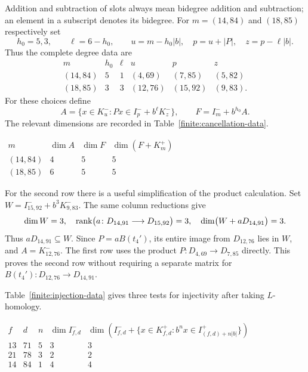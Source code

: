 Addition and subtraction of slots always mean bidegree
addition and subtraction; an element in a subscript denotes its
bidegree.  For $m=(14,84)$ and $(18,85)$ respectively set
\[
 h_0=5,3,\qquad \ell=6-h_0,\qquad
 u=m-h_0|b|,\quad p=u+|P|,\quad z=p-\ell|b|.
\]
Thus the complete degree data are
\[
\begin{array}{c|cc|ccc}
 m&h_0&\ell&u&p&z\\\hline
 (14,84)&5&1&(4,69)&(7,85)&(5,82)\\
 (18,85)&3&3&(12,76)&(15,92)&(9,83).
\end{array}
\]
For these choices define
\begin{equation}\label{finite:cancellation-spaces}
 A=\{x\in K^-_u:Px\in I^-_p+b^\ell K^-_z\},
 \qquad F=I^-_m+b^{h_0}A.
\end{equation}
The relevant dimensions are recorded in
Table~\ref{finite:cancellation-data}.

\begin{table}[htbp]
\centering
\(
\begin{array}{c|rrr}
 m&\dim A&\dim F&\dim(F+K^+_m)\\\hline
 (14,84)&4&5&5\\
 (18,85)&6&5&5
\end{array}
\)
\caption{Dimensions of the cancellation subspaces.}
\label{finite:cancellation-data}
\end{table}

For the second row there is a useful simplification of the product
calculation.  Set $W=I^-_{15,92}+b^3K^-_{9,83}$.  The same column
reductions give
\begin{equation}\label{finite:factorization-containment}
 \dim W=3,\quad
 \operatorname{rank}\bigl(a\colon D_{14,91}\longrightarrow D_{15,92}\bigr)=3,
 \quad \dim\bigl(W+aD_{14,91}\bigr)=3.
\end{equation}
Thus $aD_{14,91}\subseteq W$.  Since $P=aB(t_4')$, its entire
image from $D_{12,76}$ lies in $W$, and $A=K^-_{12,76}$.
The first row uses the product $P\colon D_{4,69}\to D_{7,85}$
directly.  This proves the second row without requiring a separate
matrix for $B(t_4')\colon D_{12,76}\to D_{14,91}$.

Table~\ref{finite:injection-data} gives three tests for injectivity
after taking $L$-homology.

\begin{table}[htbp]
\centering
\(
\begin{array}{ccr|rr}
 f&d&n&\dim I^-_{f,d}&
 \dim\left(I^-_{f,d}+
  \{x\in K^+_{f,d}:b^nx\in I^+_{(f,d)+n|b|}\}\right)\\\hline
 13&71&5&3&3\\
 21&78&3&2&2\\
 14&84&1&4&4
\end{array}
\)
\caption{Enclosure tests for injectivity on fifth-differential homology.}
\label{finite:injection-data}
\end{table}

